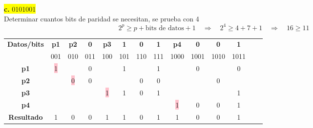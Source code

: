 \documentclass{article}
\begin{document}
	\begin{center}
		\hspace{3cm}\colorbox{yellow}{{\textbf{c.} 0101001}}\newline
		\\Determinar cuantos bits de paridad se necesitan, se prueba con 4
		\[
		2^p \geq p + \text{bits de datos} + 1
		\quad \Rightarrow \quad	2^4 \geq 4 + 7 + 1 \quad \Rightarrow \quad 16 \geq 11
		\]
		
		\begin{table}[h!]
			\centering
			\begin{tabular}{c|ccccccccccccc}
				\toprule
				\textbf{Datos/bits} & \textbf{p1} & \textbf{p2} & \textbf{0} & \textbf{p3} & \textbf{1} & \textbf{0} & \textbf{1} & \textbf{p4} & \textbf{0} & \textbf{0} & \textbf{1} \\ & \scriptsize001 & \scriptsize010 & \scriptsize011 & \scriptsize100 & \scriptsize101 & \scriptsize110 & \scriptsize111 & \scriptsize1000 & \scriptsize1001 & \scriptsize1010 & \scriptsize1011 \\
				\midrule
				\textbf{p1} & \colorbox{pink}{1} & & 0 & & 1 & & 1 & & 0 & & 0 \\
				\midrule
				\textbf{p2} &  & \colorbox{pink}{0} & 0 & & & 0 & 0 & & & 0 &  \\
				\midrule
				\textbf{p3} & & & & \colorbox{pink}{1} & 1 & 0 & 1 & & & & 1 \\
				\midrule
				\textbf{p4} & & & & & & & & \colorbox{pink}{1} & 0 & 0 & 1 \\
				\midrule
				\midrule
				\textbf{Resultado} & 1 & 0 & 0 & 1 & 1 & 0 & 1 & 1 & 0 & 0 & 1\\
				\bottomrule
			\end{tabular}
		\end{table}
	\end{center}
	\newpage
\end{document}
